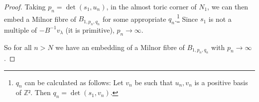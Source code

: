 \documentclass[12pt,a4paper,draft]{scrartcl}
\begin{document}
\begin{proof}
Taking $p_n=\det(s_1,u_n)$, in the almost toric corner of $N_1$, we can then embed a Milnor fibre of $B_{1,p_n,q_n}$ for some appropriate $q_n$.\footnote{$q_n$ can be calculated as follows: Let $v_n$ be such that $u_n, v_n$ is a positive basis of $ℤ²$. Then $q_n = \det(s_1,v_n).$}
Since $s_1$ is not a multiple of $-B^{-1}v_λ$ (it is primitive), $p_n → ∞$.

So for all $n>N$ we have an embedding of a Milnor fibre of $B_{1,p_n,q_n}$ with $p_n → ∞$.
\end{proof}
\end{document}
